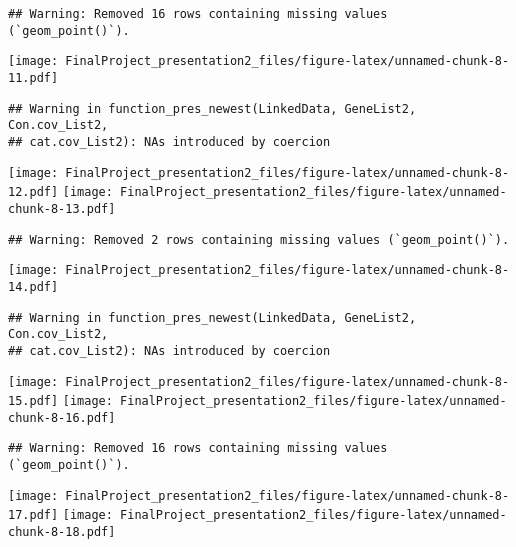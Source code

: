 \documentclass[
]{article}
\begin{document}
\begin{verbatim}
## Warning: Removed 16 rows containing missing values (`geom_point()`).
\end{verbatim}

\texttt{[image: FinalProject\_presentation2\_files/figure-latex/unnamed-chunk-8-11.pdf]}

\begin{verbatim}
## Warning in function_pres_newest(LinkedData, GeneList2, Con.cov_List2,
## cat.cov_List2): NAs introduced by coercion
\end{verbatim}

\texttt{[image: FinalProject\_presentation2\_files/figure-latex/unnamed-chunk-8-12.pdf]}
\texttt{[image: FinalProject\_presentation2\_files/figure-latex/unnamed-chunk-8-13.pdf]}

\begin{verbatim}
## Warning: Removed 2 rows containing missing values (`geom_point()`).
\end{verbatim}

\texttt{[image: FinalProject\_presentation2\_files/figure-latex/unnamed-chunk-8-14.pdf]}

\begin{verbatim}
## Warning in function_pres_newest(LinkedData, GeneList2, Con.cov_List2,
## cat.cov_List2): NAs introduced by coercion
\end{verbatim}

\texttt{[image: FinalProject\_presentation2\_files/figure-latex/unnamed-chunk-8-15.pdf]}
\texttt{[image: FinalProject\_presentation2\_files/figure-latex/unnamed-chunk-8-16.pdf]}

\begin{verbatim}
## Warning: Removed 16 rows containing missing values (`geom_point()`).
\end{verbatim}

\texttt{[image: FinalProject\_presentation2\_files/figure-latex/unnamed-chunk-8-17.pdf]}
\texttt{[image: FinalProject\_presentation2\_files/figure-latex/unnamed-chunk-8-18.pdf]}
\end{document}
